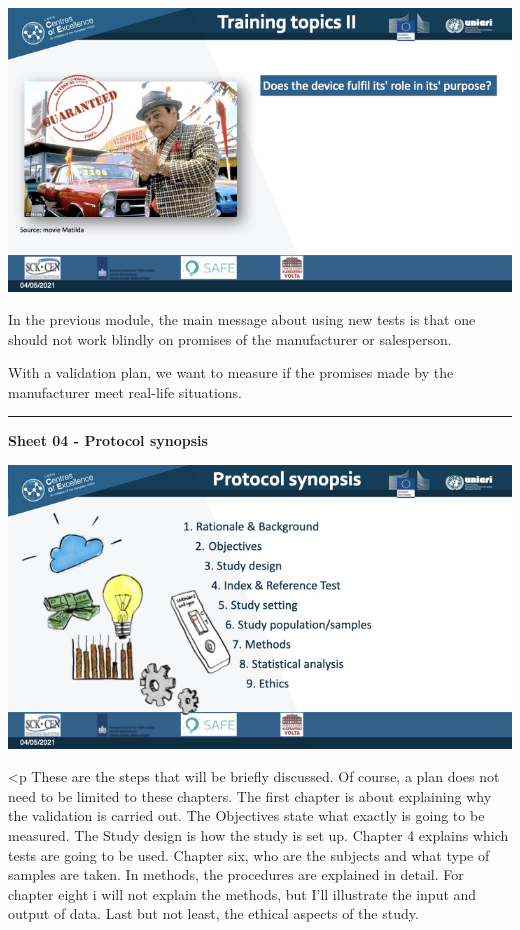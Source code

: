 \documentclass[
]{book}
\newcommand{\RL}[1]{\beginR #1\endR}
\begin{document}
\includegraphics{images/m03/m03_validation_of_test_kits_v2_2.003.jpeg}

In the previous module, the main message about using new tests is that
one should not work blindly on promises of the manufacturer or
salesperson.

With a validation plan, we want to measure if the promises made by the
manufacturer meet real-life situations.

\begin{center}\rule{0.5\linewidth}{0.5pt}\end{center}

\textbf{Sheet 04 - Protocol synopsis}

\includegraphics{images/m03/m03_validation_of_test_kits_v2_2.004.jpeg}

\textless p
These are the steps that will be briefly discussed. Of course, a plan
does not need to be limited to these chapters. The first chapter is
about explaining why the validation is carried out. The Objectives state
what exactly is going to be measured. The Study design is how the study
is set up. Chapter 4 explains which tests are going to be used. Chapter
six, who are the subjects and what type of samples are taken. In
methods, the procedures are explained in detail. For chapter eight i
will not explain the methods, but I\RL{'}ll illustrate the input
and output of data. Last but not least, the ethical aspects of the
study.
\end{document}
